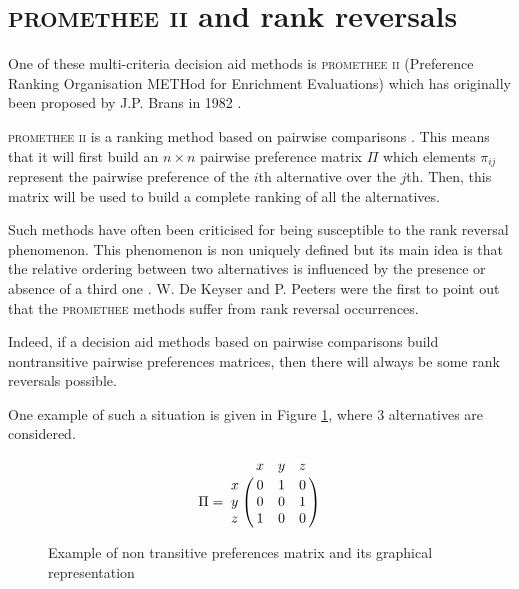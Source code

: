 \documentclass[conference,compsoc]{IEEEtran}
\begin{document}
\section{\textsc{promethee ii} and rank reversals}
One of these multi-criteria decision aid methods is \textsc{promethee ii} (Preference Ranking Organisation METHod for Enrichment Evaluations) which has originally been proposed by J.P. Brans in 1982 \cite{Bra1982}.

\textsc{promethee ii} is a ranking method based on pairwise comparisons \cite{mareschal2008rank}. This means that it will first build an $n \times n$ pairwise preference matrix $\Pi$ which elements $\pi_{ij}$ represent the pairwise preference of the $i$th alternative over the $j$th. Then, this matrix will be used to build a complete ranking of all the alternatives.

Such methods have often been criticised for being susceptible to the rank reversal phenomenon. This phenomenon is non uniquely defined but its main idea is that the relative ordering between two alternatives is influenced by the presence or absence of a third one \cite{Brans2016}.
W. De Keyser and P. Peeters \cite{de1996note} were the first to point out that the \textsc{promethee} methods suffer from rank reversal occurrences.

Indeed, if a decision aid methods based on pairwise comparisons build nontransitive pairwise preferences matrices, then there will always be some rank reversals possible.

One example of such a situation is given in Figure \ref{fig:untransitive_pref_example}, where 3 alternatives are considered.
\begin{figure}[h]
\begin{minipage}{.2\textwidth}
    \begin{equation*}
        \Pi   = \bordermatrix{~ & x    & y    & z   \cr
                            x & 0    & 1    & 0   \cr
                            y & 0    & 0    & 1   \cr
                            z & 1    & 0    & 0   \cr}
    \end{equation*}
\end{minipage}
\begin{minipage}{.2\textwidth}
    \begin{center}
   \end{center}
\end{minipage}%
\caption{Example of non transitive preferences matrix and its graphical representation} \label{fig:untransitive_matrix}
\label{fig:untransitive_pref_example}
\end{figure}
\end{document}
